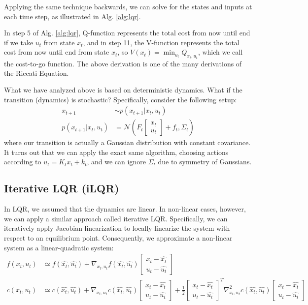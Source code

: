 Applying the same technique backwards, we can solve for the states and inputs at each time step, as illustrated in Alg. \ref{alg:lqr}.

In step 5 of Alg. \ref{alg:lqr}, Q-function represents the total cost from now until end if we take $u_t$ from state $x_t$, and in step 11, the V-function represents the total cost from now until end from state $x_t$, so $V(x_t) = \min_{u_t}Q_{x_t,u_t}$, which we call the cost-to-go function. The above derivation is one of the many derivations of the Riccati Equation.

What we have analyzed above is based on deterministic dynamics. What if the transition (dynamics) is stochastic? Specifically, consider the following setup:
\begin{align*}
    x_{t+1} &\sim p(x_{t+1}|x_t,u_t)\\
    p(x_{t+1}|x_t,u_t) &= \mathcal{N}\left(F_t\begin{bmatrix}x_t\\u_t\end{bmatrix} + f_t, \Sigma_t\right)
\end{align*}
where our transition is actually a Gaussian distribution with constant covariance. It turns out that we can apply the exact same algorithm, choosing actions according to $u_t = K_tx_t + k_t$, and we can ignore $\Sigma_t$ due to symmetry of Gaussians.

\subsection{Iterative LQR (iLQR)}
In LQR, we assumed that the dynamics are linear. In non-linear cases, however, we can apply a similar approach called iterative LQR. Specifically, we can iteratively apply Jacobian linearization to locally linearize the system with respect to an equilibrium point. Consequently, we approximate a non-linear system as a linear-quadratic system:
\begin{align*}
    f(x_t,u_t) &\simeq f(\hat{x_t}, \hat{u_t}) + \nabla_{x_t,u_t}f(\hat{x_t}, \hat{u_t})\begin{bmatrix}x_t-\hat{x_t}\\u_t-\hat{u_t}\end{bmatrix}\\
    c(x_t,u_t) &\simeq c(\hat{x_t}, \hat{u_t}) + \nabla_{x_t,u_t}c(\hat{x_t}, \hat{u_t})\begin{bmatrix}x_t-\hat{x_t}\\u_t-\hat{u_t}\end{bmatrix} + \frac{1}{2}\begin{bmatrix}x_t-\hat{x_t}\\u_t-\hat{u_t}\end{bmatrix}^T\nabla^2_{x_t,u_t}c(\hat{x_t}, \hat{u_t})\begin{bmatrix}x_t-\hat{x_t}\\u_t-\hat{u_t}\end{bmatrix}
\end{align*}


